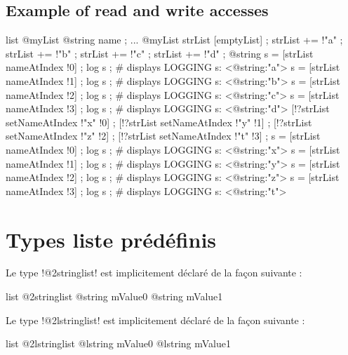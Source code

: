 \subsection{Example of read and write accesses}

\begin{galgas}
list @myList {
  @string name ;
}
...
@myList strList [emptyList] ;
strList += !"a" ;
strList += !"b" ;
strList += !"c" ;
strList += !"d" ;
@string s = [strList nameAtIndex !0] ;
log s ; # displays LOGGING s: <@string:"a">
s = [strList nameAtIndex !1] ;
log s ; # displays LOGGING s: <@string:"b">
s = [strList nameAtIndex !2] ;
log s ; # displays LOGGING s: <@string:"c">
s = [strList nameAtIndex !3] ;
log s ; # displays LOGGING s: <@string:"d">
[!?strList setNameAtIndex !"x" !0] ;
[!?strList setNameAtIndex !"y" !1] ;
[!?strList setNameAtIndex !"z" !2] ;
[!?strList setNameAtIndex !"t" !3] ;
s = [strList nameAtIndex !0] ;
log s ; # displays LOGGING s: <@string:"x">
s = [strList nameAtIndex !1] ;
log s ; # displays LOGGING s: <@string:"y">
s = [strList nameAtIndex !2] ;
log s ; # displays LOGGING s: <@string:"z">
s = [strList nameAtIndex !3] ;
log s ; # displays LOGGING s: <@string:"t">
\end{galgas}


\section{Types liste prédéfinis}


Le type \ggs!@2stringlist! est implicitement déclaré de la façon suivante :

\begin{galgasbox}
list @2stringlist {
  @string mValue0
  @string mValue1
}
\end{galgasbox}









Le type \ggs!@2lstringlist! est implicitement déclaré de la façon suivante :

\begin{galgasbox}
list @2lstringlist {
  @lstring mValue0
  @lstring mValue1
}
\end{galgasbox}








